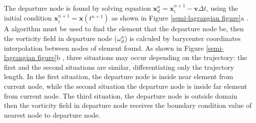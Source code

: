 \documentclass[10pt,fleqn,a4paper,twoside]{article}
\begin{document}
\smallskip
The departure node is found by solving equation $\mathbf{x}_{d}^{n} = \mathbf{x}_{i}^{n+1} - \mathbf{v} \Delta t$, using the initial condition $\mathbf{x}_{i}^{n+1} = \mathbf{x}(t^{n+1})$ as shown in Figure \ref{semi-lagrangian figure}a . 
A algorithm must be used to find the element that the departure node be, then the vorticity field in departure node ($\omega_{d}^{n}$) is calculed by barycenter coordinates interpolation between nodes of element found.
As shown in Figure \ref{semi-lagrangian figure}b , three situations may occur depending on the trajectory: the first and the second situations are similar, differentiating only the trajectory length. 
In the first situation, the departure node is inside near element from current node, while the second situation the departure node is inside far element from current node. 
The third situation, the departure node is outside domain then the vorticity field in departure node receives the boundary condition value of nearest node to departure node.
\end{document}
